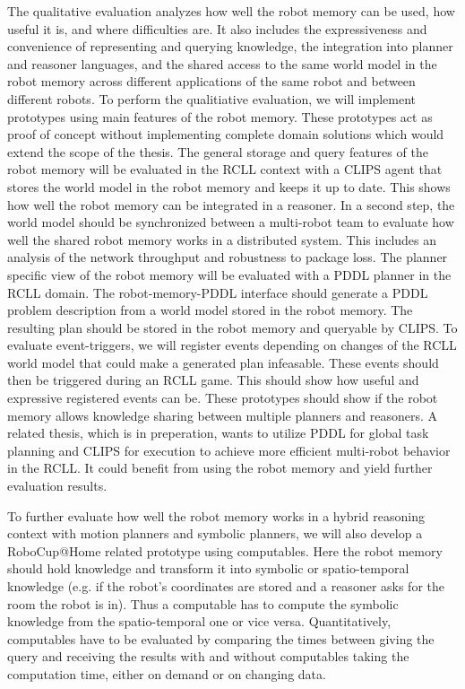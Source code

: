 \documentclass[a4paper,11pt]{article}
\begin{document}
The qualitative evaluation analyzes how well the robot memory can be
used, how useful it is, and where difficulties are. It also includes
the expressiveness and convenience of representing and querying
knowledge, the integration into planner and reasoner languages, and
the shared access to the same world model in the robot memory across
different applications of the same robot and between different
robots. To perform the qualitiative evaluation, we will implement
prototypes using main features of the robot memory. These prototypes
act as proof of concept without implementing complete domain solutions
which would extend the scope of the thesis.
%
The general storage and query features of the robot memory will be
evaluated in the RCLL context with a CLIPS agent that stores the world
model in the robot memory and keeps it up to date. This shows how well
the robot memory can be integrated in a reasoner.
%
In a second step, the world model should be synchronized between a
multi-robot team to evaluate how well the shared robot memory works in
a distributed system. This includes an analysis of the network
throughput and robustness to package loss.
%
The planner specific view of the robot memory will be evaluated with a
PDDL planner in the RCLL domain. The robot-memory-PDDL interface
should generate a PDDL problem description from a world model stored
in the robot memory. The resulting plan should be stored in the robot
memory and queryable by CLIPS.
%
To evaluate event-triggers, we will register events depending on
changes of the RCLL world model that could make a generated plan
infeasable. These events should then be triggered during an RCLL
game. This should show how useful and expressive registered events can
be.
% 
These prototypes should show if the robot memory allows knowledge
sharing between multiple planners and reasoners. A related thesis,
which is in preperation, wants to utilize PDDL for global task
planning and CLIPS for execution to achieve more efficient multi-robot
behavior in the RCLL. It could benefit from using the robot memory and
yield further evaluation results.

To further evaluate how well the robot memory works in a hybrid
reasoning context with motion planners and symbolic planners, we will
also develop a RoboCup@Home related prototype using computables. Here
the robot memory should hold knowledge and transform it into symbolic
or spatio-temporal knowledge (e.g. if the robot's coordinates are
stored and a reasoner asks for the room the robot is in). Thus a
computable has to compute the symbolic knowledge from the
spatio-temporal one or vice versa. Quantitatively, computables have to
be evaluated by comparing the times between giving the query and
receiving the results with and without computables taking the
computation time, either on demand or on changing data.
\end{document}
